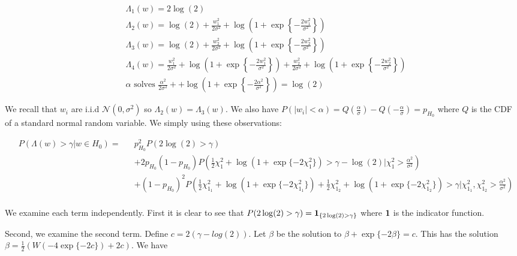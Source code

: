 \documentclass[english]{article}
\begin{document}
\begin{equation}
\begin{aligned}
&\Lambda_1(w) = 2\log(2)\\
&\Lambda_2(w) = \log(2) +\frac{w_1^2}{2\sigma^2}+\log\left(1 + \exp\left\{-\frac{2w_1^2}{\sigma^2}\right\}\right)\\
&\Lambda_3(w) = \log(2) +\frac{w_2^2}{2\sigma^2}+\log\left(1 + \exp\left\{-\frac{2w_2^2}{\sigma^2}\right\}\right)\\
&\Lambda_4(w) = \frac{w_1^2}{2\sigma^2}+\log\left(1 + \exp\left\{-\frac{2w_1^2}{\sigma^2}\right\}\right)+\frac{w_2^2}{2\sigma^2}+\log\left(1 + \exp\left\{-\frac{2w_2^2}{\sigma^2}\right\}\right)\\
&\alpha \text{ solves } \frac{\alpha^2}{2\sigma^2} + +\log\left(1 + \exp\left\{-\frac{2\alpha^2}{\sigma^2}\right\}\right) = \log(2)
\end{aligned}
\end{equation}

We recall that $w_i$ are i.i.d $\mathcal{N}(0,\sigma^2)$ so $\Lambda_2(w) = \Lambda_3(w)$. We also have $P(|w_i| < \alpha) = Q\left(\frac{\alpha}{\sigma}\right)-Q\left(-\frac{\alpha}{\sigma}\right)=p_{H_0}$ where $Q$ is the CDF of a standard normal random variable. We simply using these observations:

\begin{equation}
\begin{aligned}
&P(\Lambda(w)>\gamma|w\in H_0) =
&&p_{H_0}^2P(2\log(2) >\gamma) \\
&&&+2p_{H_0}\left(1-p_{H_0}\right)P\left(\frac{1}{2}\chi_1^2+\log\left(1+\exp\{-2\chi_1^2\}\right)>\gamma-\log(2)|\chi_1^2>\frac{\alpha^2}{\sigma^2}\right)\\
&&&+\left(1-p_{H_0}\right)^2P\left(\frac{1}{2}\chi_{1_1}^2+\log\left(1+\exp\{-2\chi_{1_1}^2\}\right)+\frac{1}{2}\chi_{1_2}^2+\log\left(1+\exp\{-2\chi_{1_2}^2\}\right)>\gamma|\chi_{1_1}^2,\chi_{1_2}^2>\frac{\alpha^2}{\sigma^2}\right)\\
\end{aligned}
\end{equation}

We examine each term independently. First it is clear to see that $P(2\log(2) >\gamma) = \mathbf 1_{\{2\log(2)>\gamma\}}$ where $\mathbf 1$ is the indicator function.

Second, we examine the second term. Define $c=2(\gamma-log(2))$. Let $\beta$ be the solution to $\beta+\exp\{-2\beta\}=c$. This has the solution $\beta = \frac{1}{2}(W(-4\exp\{-2c\})+2c)$. We have
\end{document}
